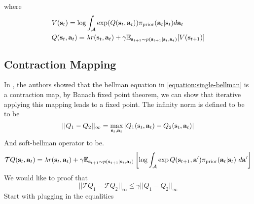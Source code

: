 where 
\begin{equation}
    \label{equation:single-bellman}
    \begin{aligned}
        &V(\bold{s}_t) = \log \int_{\mathcal{A}} \exp(Q(\bold{s}_t, \bold{a}_t)) \pi_{\text{prior}}(\bold{a}_t | \bold{s}_t) d\bold{a}_t \\
        &Q(\bold{s}_t, \bold{a}_t) = \lambda r(\bold{s}_t, \bold{a}_t) + \gamma \mathbb{E}_{\bold{s}_{t+1} \sim p(\bold{s}_{t+1} | \bold{s}_t, \bold{a}_t)}[ V(\bold{s}_{t+1})]
    \end{aligned}
\end{equation}

\subsection{Contraction Mapping}
In \cite{haarnoja2017reinforcement}, the authors showed that the bellman equation in \ref{equation:single-bellman} is a contraction map, by Banach fixed point theorem, we can show that iterative applying this mapping leads to a fixed point. The infinity norm is defined to be to be 
\begin{equation}
|| Q_1 - Q_2 ||_{\infty} = \max_{\bold{s}_t, \bold{a}_t} | Q_1(\bold{s}_t, \bold{a}_t) - Q_2(\bold{s}_t, \bold{a}_t) |
\end{equation}
And soft-bellman operator to be. 
\begin{equation}
    \mathcal{T} Q(\bold{s}_t, \bold{a}_t) = \lambda r(\bold{s}_t, \bold{a}_t) + \gamma \mathbb{E}_{\bold{s}_{t+1} \sim p(\bold{s}_{t+1} | \bold{s}_t, \bold{a}_t)} \left[ \log \int_{\mathcal{A}} \exp Q(\bold{s}_{t+1}, \bold{a}' ) \pi_{\text{prior}}(\bold{a}_t | \bold{s}_t) \ d\bold{a}' \right]
\end{equation}
We would like to proof that 
$$
|| \mathcal{T} Q_1 - \mathcal{T} Q_2 ||_{\infty} \le \gamma || Q_1 - Q_2 ||_{\infty}
$$
Start with plugging  in the equalities 
